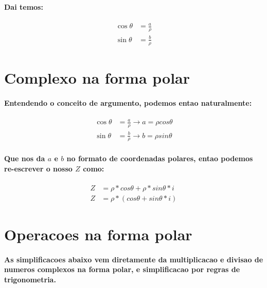 \documentclass[12pt,twoside, a4paper, twocolumn]{article}
\begin{document}
\paragraph*{Dai temos:}

\begin{equation}
    \begin{aligned}
        \cos{\theta} & = \frac{a}{\rho} \\
        \sin{\theta} & = \frac{b}{\rho}
    \end{aligned}
\end{equation}

\section{Complexo na forma polar}

\paragraph*{Entendendo o conceito de argumento, podemos entao naturalmente:}

\begin{equation}
    \begin{aligned}
        \cos{\theta} & = \frac{a}{\rho} \rightarrow a =\rho cos{\theta} \\
        \sin{\theta} & = \frac{b}{\rho} \rightarrow b =\rho sin{\theta}
    \end{aligned}
\end{equation}

\paragraph*{Que nos da $a$ e $b$ no formato de coordenadas polares, entao podemos re-escrever o nosso $Z$ como:}

\begin{equation}
    \begin{aligned}
        Z & = \rho * cos{\theta} + \rho * sin{\theta} * i        \\
        Z & = \rho * \left(cos{\theta} +  sin{\theta} * i\right)
    \end{aligned}
\end{equation}

\section{Operacoes na forma polar}

\paragraph*{As simplificacoes abaixo vem diretamente da multiplicacao e divisao de numeros complexos na forma polar, e simplificacao por regras de trigonometria.}
\end{document}
